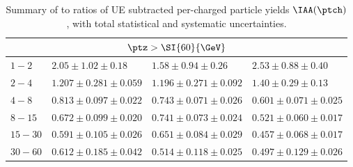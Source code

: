 \begin{table}[!ht]
\begin{center}
\begin{tabular}{|l|l|l|l|}
\hline \hline
\multicolumn{4}{|c|}{\small {$\ptz > \SI{60}{\GeV}$}} \\ \hline
\footnotesize {$1 - 2$} & \footnotesize {$2.05 \pm 1.02 \pm 0.18$}  & \footnotesize {$1.58 \pm 0.94 \pm 0.26$}  & \footnotesize {$2.53 \pm 0.88 \pm 0.40$}  \\
\footnotesize {$2 - 4$} & \footnotesize {$1.207 \pm 0.281 \pm 0.059$}  & \footnotesize {$1.196 \pm 0.271 \pm 0.092$}  & \footnotesize {$1.40 \pm 0.29 \pm 0.13$}  \\
\footnotesize {$4 - 8$} & \footnotesize {$0.813 \pm 0.097 \pm 0.022$}  & \footnotesize {$0.743 \pm 0.071 \pm 0.026$}  & \footnotesize {$0.601 \pm 0.071 \pm 0.025$}  \\
\footnotesize {$8 - 15$} & \footnotesize {$0.672 \pm 0.099 \pm 0.020$}  & \footnotesize {$0.741 \pm 0.073 \pm 0.024$}  & \footnotesize {$0.521 \pm 0.060 \pm 0.017$}  \\
\footnotesize {$15 - 30$} & \footnotesize {$0.591 \pm 0.105 \pm 0.026$}  & \footnotesize {$0.651 \pm 0.084 \pm 0.029$}  & \footnotesize {$0.457 \pm 0.068 \pm 0.017$}  \\
\footnotesize {$30 - 60$} & \footnotesize {$0.612 \pm 0.185 \pm 0.042$}  & \footnotesize {$0.514 \pm 0.118 \pm 0.025$}  & \footnotesize {$0.497 \pm 0.129 \pm 0.026$}  \\
\hline
\end{tabular}
\caption{Summary of \PbPb to \pp ratios of UE subtracted per-\Zboson charged particle yields $\IAA (\ptch)$, with total statistical and systematic uncertainties.}
\label{tab3}
\end{center}
\end{table}
